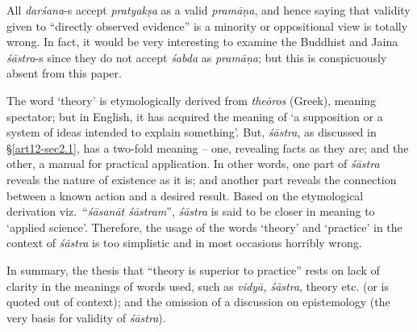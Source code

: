 All {\sl darśana}-s accept {\sl pratyakṣa} as a valid {\sl pramāṇa}, and hence saying that validity given to ``directly observed evidence'' is a minority or oppositional view is totally wrong. In fact, it  would be very interesting to examine the Buddhist and Jaina {\sl śāstra}-s since they do not accept {\sl śabda} as {\sl pramāṇa}; but this is conspicuously absent from this paper.

The word `theory' is etymologically derived from {\sl theōros} (Greek), meaning spectator; but in English, it has acquired the meaning of `a supposition or a system of ideas intended to explain something'. But, {\sl śāstra}, as discussed in \S\ref{art12-sec2.1}, has a two-fold meaning -- one, revealing facts as they are; and the other, a manual for practical application. In other words, one part of {\sl śāstra} reveals the nature of existence as it is; and another part reveals the connection between a known action and a desired result. Based on the etymological derivation viz.\ ``{\sl śāsanāt śāstram}'', {\sl śāstra} is said to be closer in meaning to `applied science'. Therefore, the usage of the words ‘theory’ and ‘practice’ in the context of {\sl śāstra} is too simplistic and in most occasions horribly wrong. 

In summary, the thesis that ``theory is superior to practice'' rests on lack of clarity in the meanings of words used, such as {\sl vidyā, śāstra}, theory etc. (or is quoted out of context); and the omission of a discussion on epistemology (the very basis for validity of {\sl śāstra}).\\[-18pt]

